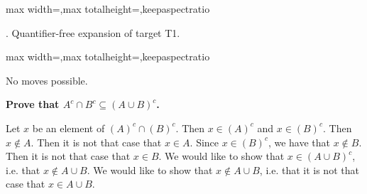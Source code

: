\documentclass[a4paper,twoside,12pt]{article} %
\makeatletter
\DeclareRobustCommand{\_}{%
  \leavevmode\vbox{%
    \hrule\@width.4em
          \@height-.16ex
          \@depth\dimexpr.16ex+.28pt\relax}}
\newcommand\Tstrut{\rule{0pt}{2.4ex}}
\newcommand\Bstrut{\rule[-1.1ex]{0pt}{0pt}}
\newenvironment{fit}{\begin{adjustbox}{max width=\textwidth,max totalheight=\textheight,keepaspectratio}}{\end{adjustbox}}
\makeatother
\begin{document}
\bigskip
\begin{steps}
\begin{fit}%
\end{fit}
\smallskip

. Quantifier-free expansion of target T1.\nopagebreak[4] 
\nopagebreak[4] 
\smallskip\nopagebreak[4] 

\begin{fit}%
\end{fit}

No moves possible.
\cleardoublepage

\end{steps}
{\begin{center} \large \textbf{Prove that $A^c \cap B^c \subseteq (A \cup B)^c$.}\end{center}}\nopagebreak[4]

\begin{center}
\begin{minipage}{120mm}
Let $x$ be an element of $(A)^c\cap (B)^c$. Then $x\in (A)^c$ and $x\in (B)^c$. Then $x\notin A$. Then it is not that case that $x\in A$. Since $x\in (B)^c$, we have that $x\notin B$. Then it is not that case that $x\in B$. We would like to show that $x\in (A\cup B)^c$, i.e. that $x\notin A\cup B$. We would like to show that $x\notin A\cup B$, i.e. that it is not that case that $x\in A\cup B$.
\end{minipage}
\end{center}
\end{document}
